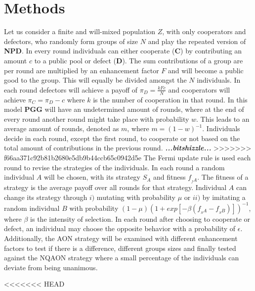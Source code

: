 \documentclass[letterpaper]{article}
\begin{document}
\section{Methods}
Let us consider a finite and will-mixed population $Z$, with only cooperators and defectors, who randomly form groups of size $N$ and play the repeated version of \textbf{NPD}. In every round individuals can either cooperate (\textbf{C}) by contributing an amount $c$ to a public pool or defect (\textbf{D}). The sum contributions of a group are per round are multiplied by an enhancement factor $F$ and will become a public good to the group. This will equally be divided amongst  the $N$ individuals. In each round defectors will achieve a payoff of $\pi_{D}= \frac{kFc}{N}$  and cooperators will achieve $\pi_{C}=\pi_{D}-c$ where $k$ is the number of cooperation in that round. In this model \textbf{PGG} will have an undetermined amount of rounds, where at the end of every round another round might take place with probability $w$. This leads to an average amount of rounds, denoted as $m$, where $m= (1-w)^{-1}$. Individuals decide in each round, except the first round, to cooperate or not based on the total amount of contributions in the previous round.
\textit{\textbf{...bitshizzle...}}
>>>>>>> f66aa371c92b81b2680e5db9b44ccb65c0942d5e
The Fermi update rule \citep{traulsen2006stochastic,grujic2014comparative} is used each round to revise the strategies of the individuals.
In each round a random individual $A$ will be chosen, with its strategy $S_{A}$ and fitness $f_{_f{A}}$. The fitness of a strategy is the average payoff over all rounds for that strategy. Individual $A$ can change its strategy through $i)$ mutating with probability $\mu$ or $ii)$ by imitating a random individual $B$ with probability $(1-\mu)(1+exp[-\beta(f_{_S{A}}-f_{_S{B}})])^{-1}$, where $\beta$ is the intensity of selection.
In each round after choosing to cooperate or defect, an individual may choose the opposite behavior with a probability of $\epsilon$.
Additionally, the AON strategy will be examined with different enhancement factors to test if there is a difference, different groups sizes and finally tested against the NQAON strategy where a small percentage of the individuals can deviate from being unanimous.


<<<<<<< HEAD
\end{document}
